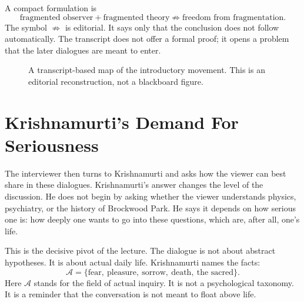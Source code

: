 A compact formulation is
\begin{equation}
\text{fragmented observer}
+
\text{fragmented theory}
\not\Rightarrow
\text{freedom from fragmentation}.
\end{equation}
The symbol \(\not\Rightarrow\) is editorial. It says only that the conclusion does not follow automatically. The transcript does not offer a formal proof; it opens a problem that the later dialogues are meant to enter.

\begin{figure}
\centering
{}
\caption{A transcript-based map of the introductory movement. This is an editorial reconstruction, not a blackboard figure.}
\end{figure}

\section{Krishnamurti's Demand For Seriousness}

The interviewer then turns to Krishnamurti and asks how the viewer can best share in these dialogues. Krishnamurti's answer changes the level of the discussion. He does not begin by asking whether the viewer understands physics, psychiatry, or the history of Brockwood Park. He says it depends on how serious one is: how deeply one wants to go into these questions, which are, after all, one's life.

This is the decisive pivot of the lecture. The dialogue is not about abstract hypotheses. It is about actual daily life. Krishnamurti names the facts:
\begin{equation}
\mathcal{A}
=
\{\text{fear},\ \text{pleasure},\ \text{sorrow},\ \text{death},\ \text{the sacred}\}.
\end{equation}
Here \(\mathcal{A}\) stands for the field of actual inquiry. It is not a psychological taxonomy. It is a reminder that the conversation is not meant to float above life.

